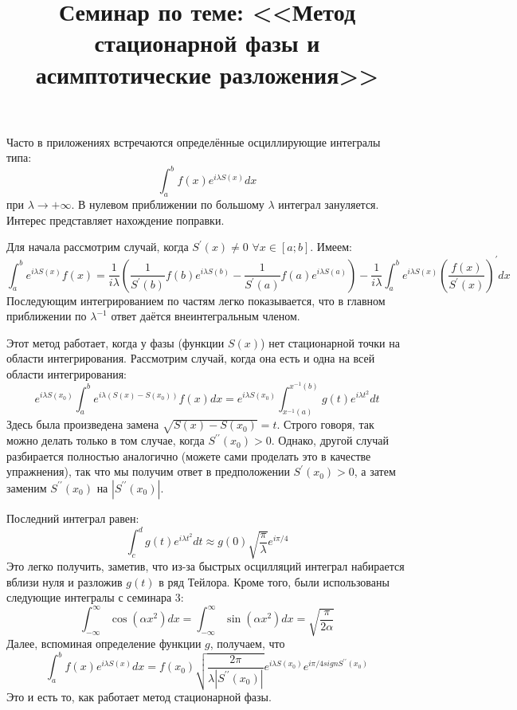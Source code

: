 \documentclass[a4paper,12pt]{article}
\begin{document}
\title{Семинар по теме: <<Метод стационарной фазы и асимптотические разложения>>}
\maketitle

\noindent
Часто в приложениях встречаются определённые осциллирующие интегралы
типа: 
\[
\int_{a}^{b}f(x)e^{i\lambda S(x)}dx
\]
при $\lambda\to+\infty$. В нулевом приближении по большому $\lambda$ интеграл зануляется. Интерес представляет нахождение поправки.  

\noindent
Для начала рассмотрим случай, когда $S^{'}(x)\ne0$ $\forall x\in [a;b]$. Имеем:
$$
\int_{a}^{b}e^{i\lambda S(x)}f(x)=\frac{1}{i\lambda}\left(\frac{1}{S^{\prime}(b)}f(b)e^{i\lambda S(b)}-\frac{1}{S^{\prime}(a)}f(a)e^{i\lambda S(a)}\right)-\frac{1}{i\lambda}\int_{a}^{b}e^{i\lambda S(x)}\left(\frac{f(x)}{S^{\prime}(x)}\right)^{\prime}dx
$$
Последующим интегрированием по частям легко показывается, что в главном приближении по $\lambda^{-1}$ ответ даётся внеинтегральным членом.

\noindent
Этот метод работает, когда у фазы (функции $S(x)$) нет стационарной точки на области интегрирования. Рассмотрим случай, когда она есть и одна на всей области интегрирования:
$$
e^{i\lambda S(x_0)}\int_{a}^{b}e^{i\lambda( S(x)-S(x_0))}f(x)dx=e^{i\lambda S(x_0)}\int_{x^{-1}(a)}^{x^{-1}(b)}g(t)e^{i\lambda t^2}dt
$$
Здесь была произведена замена $\sqrt{S(x)-S(x_0)}=t$. Строго говоря, так можно делать только в том случае, когда $S^{\prime\prime}(x_0)>0$. Однако, другой случай разбирается полностью аналогично (можете сами проделать это в качестве упражнения), так что мы получим ответ в предположении $S^{\prime}(x_0)>0$, а затем заменим $S^{\prime\prime}(x_0)$ на $|S^{\prime\prime}(x_0)|$. 

\noindent
Последний интеграл равен:
$$
\int_{c}^{d}g(t)e^{i\lambda t^2}dt\approx g(0)\sqrt{\frac{\pi}{\lambda}}e^{i\pi/4}
$$
Это легко получить, заметив, что из-за быстрых осцилляций интеграл набирается вблизи нуля и разложив $g(t)$ в ряд Тейлора. Кроме того, были использованы следующие интегралы с семинара 3:
\[
\int_{-\infty}^{\infty}\cos(\alpha x^{2})dx=\int_{-\infty}^{\infty}\sin(\alpha x^{2})dx=\sqrt{\frac{\pi}{2\alpha}}
\]
Далее, вспоминая определение функции $g$, получаем, что 
$$
\int_{a}^{b}f(x)e^{i\lambda S(x)}dx=f(x_0)\sqrt{\frac{2\pi}{\lambda |S^{\prime\prime}(x_0)|}}e^{i\lambda S(x_0)}e^{i\pi/4 sign S^{\prime\prime}(x_0)}
$$
Это и есть то, как работает метод стационарной фазы.
\end{document}

